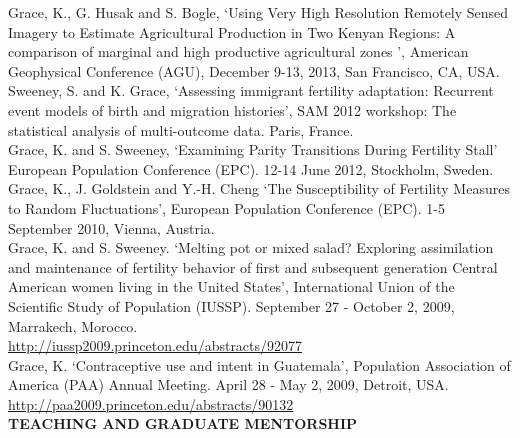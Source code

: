 \documentclass[11pt]{article} %
\begin{document}
\noindent
Grace, K., G. Husak and S. Bogle, `Using Very High Resolution Remotely Sensed Imagery to Estimate Agricultural Production in Two Kenyan Regions: A comparison of marginal and high productive agricultural zones ', American Geophysical Conference (AGU), December 9-13, 2013, San Francisco, CA, USA.\\

 
 \noindent
Sweeney, S. and K. Grace, `Assessing immigrant fertility adaptation: Recurrent event models of birth and migration histories', SAM 2012 workshop: The statistical analysis of multi-outcome data. Paris, France.\\

\noindent
Grace, K. and S. Sweeney, `Examining Parity Transitions During Fertility Stall' European Population Conference (EPC). 12-14 June 2012, Stockholm, Sweden.\\

\noindent
Grace, K.,  J. Goldstein and Y.-H. Cheng `The Susceptibility of Fertility Measures to Random Fluctuations', European Population Conference (EPC). 1-5 September 2010, Vienna, Austria. \\

\noindent
Grace, K. and S. Sweeney. `Melting pot or mixed salad? Exploring assimilation and 
maintenance of fertility behavior of first and subsequent generation Central American 
women living in the United States', International Union of the Scientific Study of 
Population (IUSSP). September 27 - October 2, 2009, Marrakech, Morocco. \\
\url{http://iussp2009.princeton.edu/abstracts/92077}\\


\noindent
Grace, K. `Contraceptive use and intent in Guatemala', Population Association of 
America (PAA) Annual Meeting. April 28 - May 2, 2009, Detroit, USA.\\
\url{http://paa2009.princeton.edu/abstracts/90132}\\



\noindent
{\large \textbf{TEACHING AND GRADUATE MENTORSHIP}}
\vspace{.5cm}
\end{document}
